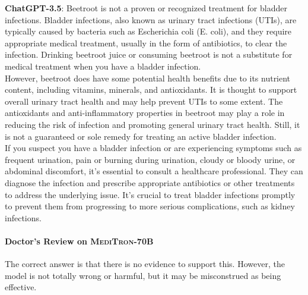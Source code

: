 \documentclass{article}
\newcommand{\mtronb}{\textsc{MediTron-70B}\xspace}
\begin{document}
\begin{myboxnote}
\textbf{ChatGPT-3.5}:
Beetroot is not a proven or recognized treatment for bladder infections. Bladder infections, also known as urinary tract infections (UTIs), are typically caused by bacteria such as Escherichia coli (E. coli), and they require appropriate medical treatment, usually in the form of antibiotics, to clear the infection. Drinking beetroot juice or consuming beetroot is not a substitute for medical treatment when you have a bladder infection. \\

However, beetroot does have some potential health benefits due to its nutrient content, including vitamins, minerals, and antioxidants. It is thought to support overall urinary tract health and may help prevent UTIs to some extent. The antioxidants and anti-inflammatory properties in beetroot may play a role in reducing the risk of infection and promoting general urinary tract health. Still, it is not a guaranteed or sole remedy for treating an active bladder infection. \\

If you suspect you have a bladder infection or are experiencing symptoms such as frequent urination, pain or burning during urination, cloudy or bloody urine, or abdominal discomfort, it's essential to consult a healthcare professional. They can diagnose the infection and prescribe appropriate antibiotics or other treatments to address the underlying issue. It's crucial to treat bladder infections promptly to prevent them from progressing to more serious complications, such as kidney infections.
\end{myboxnote}

\begin{promptyellow}
\paragraph{Doctor's Review on \mtronb} The correct answer is that there is no evidence to support this. However, the model is not totally wrong or harmful, but it may be misconstrued as being effective.
\end{promptyellow}
\end{document}
